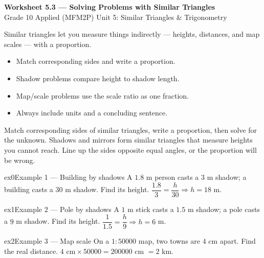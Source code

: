 \documentclass[11pt]{article}
\begin{document}
\begin{center}
{\LARGE\bfseries\color{titleblue}Worksheet 5.3 --- Solving Problems with Similar Triangles}\\[2pt]
{\small Grade 10 Applied (MFM2P) \textperiodcentered{} Unit 5: Similar Triangles \& Trigonometry}
\end{center}

\begin{ideabox}
Similar triangles let you measure things indirectly --- heights, distances, and map scales --- with a proportion.
\begin{itemize}[leftmargin=*,itemsep=2pt]
  \item Match corresponding sides and write a proportion.
  \item Shadow problems compare height to shadow length.
  \item Map/scale problems use the scale ratio as one fraction.
  \item Always include units and a concluding sentence.
\end{itemize}
\end{ideabox}

\begin{learnbox}
Match corresponding sides of similar triangles, write a proportion, then solve for the unknown.
Shadows and mirrors form similar triangles that measure heights you cannot reach.
Line up the sides opposite equal angles, or the proportion will be wrong.
\end{learnbox}


\begin{example}{ex0}{Example 1 --- Building by shadows}
A $1.8$ m person casts a $3$ m shadow; a building casts a $30$ m shadow. Find its height.
\soln $\dfrac{1.8}{3}=\dfrac{h}{30}\Rightarrow h=18$ m.
\end{example}

\begin{example}{ex1}{Example 2 --- Pole by shadows}
A $1$ m stick casts a $1.5$ m shadow; a pole casts a $9$ m shadow. Find its height.
\soln $\dfrac{1}{1.5}=\dfrac{h}{9}\Rightarrow h=6$ m.
\end{example}

\begin{example}{ex2}{Example 3 --- Map scale}
On a $1:50000$ map, two towns are $4$ cm apart. Find the real distance.
\soln $4\text{ cm}\times50000=200000$ cm $=2$ km.
\end{example}
\end{document}
